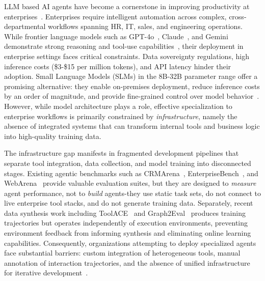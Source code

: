 \documentclass{article}
\theoremstyle{plain}
\theoremstyle{definition}
\theoremstyle{remark}
\begin{document}
LLM based AI agents have become a cornerstone in improving productivity at enterprises~\cite{glean2025platform}. Enterprises require intelligent automation across complex, cross-departmental workflows spanning HR, IT, sales, and engineering operations. While frontier language models such as GPT-4o~\cite{hurst2024gpt}, Claude~\cite{anthropiclaude}, and Gemini~\cite{gemini3} demonstrate strong reasoning and tool-use capabilities~\cite{li2024humaneval, zhaocommit0, pantraining, yangswe}, their deployment in enterprise settings faces critical constraints. Data sovereignty regulations, high inference costs (\$3-\$15 per million tokens), and API latency hinder their adoption. Small Language Models (SLMs) in the 8B-32B parameter range offer a promising alternative: they enable on-premises deployment, reduce inference costs by an order of magnitude, and provide fine-grained control over model behavior~\cite{belcak2025small}. However, while model architecture plays a role, effective specialization to enterprise workflows is primarily constrained by \textit{infrastructure}, namely the absence of integrated systems that can transform internal tools and business logic into high-quality training data.

The infrastructure gap manifests in fragmented development pipelines that separate tool integration, data collection, and model training into disconnected stages. Existing agentic benchmarks such as CRMArena~\cite{huang2025crmarena}, EnterpriseBench~\cite{vishwakarma2025can}, and WebArena~\cite{zhouwebarena} provide valuable evaluation suites, but they are designed to \textit{measure} agent performance, not to \textit{build} agents-they use static task sets, do not connect to live enterprise tool stacks, and do not generate training data. Separately, recent data synthesis work including ToolACE~\cite{liutoolace} and Graph2Eval~\cite{chen2025graph2eval} produces training trajectories but operates independently of execution environments, preventing environment feedback from informing synthesis and eliminating online learning capabilities. Consequently, organizations attempting to deploy specialized agents face substantial barriers: custom integration of heterogeneous tools, manual annotation of interaction trajectories, and the absence of unified infrastructure for iterative development~\cite{warrier2023managing, marro2025llm, bodensohn2025unveiling}.
\end{document}
